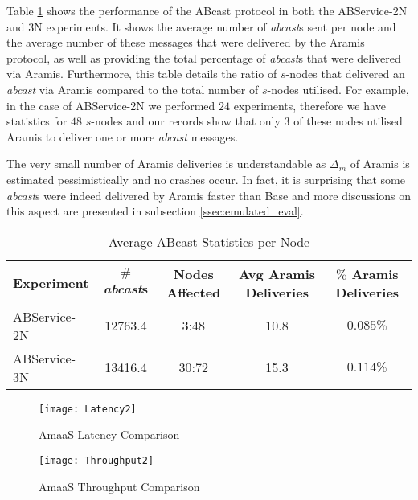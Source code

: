     Table \ref{table:emulated_transcation_aramis_deliveries} shows the performance of the \textsf{ABcast} protocol in both the ABService-2N and 3N experiments.  It shows the average number of \emph{abcast}s sent per node and the average number of these messages that were delivered by the Aramis protocol, as well as providing the total percentage of \emph{abcast}s that were delivered via Aramis.  Furthermore, this table details the ratio of $s$-nodes that delivered an \emph{abcast} via Aramis compared to the total number of $s$-nodes utilised.  For example, in the case of ABService-2N we performed $24$ experiments, therefore we have statistics for $48$ $s$-nodes and our records show that only $3$ of these nodes utilised Aramis to deliver one or more \emph{abcast} messages.  
    
    The very small number of \textsf{Aramis} deliveries is understandable as $\Delta_m$ of \textsf{Aramis} is estimated pessimistically and no crashes occur.  In fact, it is surprising that some \emph{abcast}s were indeed delivered by \textsf{Aramis} faster than \textsf{Base} and more discussions on this aspect are presented in subsection \ref{ssec:emulated_eval}.  
	
	\begin{table}[h]
	  \begin{center}
	    \begin{tabular}{|l|c|c|c|c|}
	    \hline
	    Experiment  & $\#$ \emph{abcast}s & Nodes Affected &  Avg Aramis Deliveries & $\%$ Aramis Deliveries \\ \hline \hline
	    ABService-2N & 12763.4 & 3:48   & 10.8  & $0.085\%$  \\ \hline
	    ABService-3N & 13416.4 & 30:72 & 15.3  & $0.114\%$ \\ \hline
	    \end{tabular}
	    \caption{Average ABcast Statistics per Node}
	    \label{table:emulated_transcation_aramis_deliveries}
	  \end{center}
	\end{table}	
	
	\begin{figure}[h]
	 \texttt{[image: Latency2]}
	 \caption{AmaaS Latency Comparison}
	 \label{fig:LatencyGraph}
	\end{figure}
	
	\begin{figure}[h]
	 \texttt{[image: Throughput2]}
	 \caption{AmaaS Throughput Comparison}
	 \label{fig:ThroughputGraph}
	\end{figure}	
	
